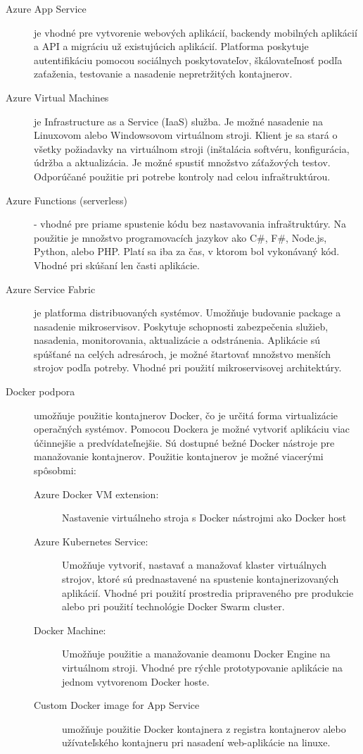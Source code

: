\begin{description}
    \item[Azure App Service] je vhodné pre vytvorenie webových aplikácií, backendy mobilných aplikácií a API a migráciu už existujúcich aplikácií.
    Platforma poskytuje autentifikáciu pomocou sociálnych poskytovateľov, škálovateľnosť podľa zaťaženia, testovanie a nasadenie nepretržitých kontajnerov.
    \item[Azure Virtual Machines] je Infrastructure as a Service (IaaS) služba. Je možné nasadenie na Linuxovom alebo Windowsovom  virtuálnom stroji. Klient je sa stará o všetky požiadavky na virtuálnom stroji (inštalácia softvéru, konfigurácia, údržba a aktualizácia. Je možné spustiť množstvo záťažových testov. Odporúčané použitie pri potrebe kontroly nad celou infraštruktúrou.
    \item[Azure Functions (serverless)]  - vhodné pre priame spustenie kódu bez nastavovania infraštruktúry. Na použitie je množstvo programovacích jazykov ako C\#, F\#, Node.js, Python, alebo PHP. Platí sa iba za čas, v ktorom bol vykonávaný kód. Vhodné pri skúšaní len časti aplikácie.
    \item[Azure Service Fabric] je platforma distribuovaných systémov. Umožňuje budovanie package a nasadenie mikroservisov. Poskytuje schopnosti zabezpečenia služieb, nasadenia, monitorovania, aktualizácie a odstránenia. Aplikácie sú spúšťané na celých adresároch, je možné štartovať množstvo menších strojov podľa potreby. Vhodné pri použití mikroservisovej architektúry.
    \item[Docker podpora] umožňuje použitie kontajnerov Docker, čo je určitá forma virtualizácie operačných systémov. Pomocou Dockera je možné vytvoriť aplikáciu viac účinnejšie a predvídateľnejšie. Sú dostupné bežné Docker nástroje pre manažovanie kontajnerov. Použitie kontajnerov je možné viacerými spôsobmi:
    \begin{description}
        \item[Azure Docker VM extension:]
            Nastavenie virtuálneho stroja s Docker nástrojmi ako Docker host
        \item[Azure Kubernetes Service:]
        Umožňuje vytvoriť, nastavať a manažovať klaster virtuálnych strojov, ktoré sú prednastavené na spustenie kontajnerizovaných aplikácií. Vhodné pri použití prostredia pripraveného pre produkcie alebo pri použití technológie Docker Swarm cluster.
        \item[Docker Machine:] Umožňuje použitie a manažovanie deamonu Docker Engine na virtuálnom stroji. Vhodné pre rýchle prototypovanie aplikácie na jednom vytvorenom Docker hoste.
        \item[Custom Docker image for App Service] umožňuje použitie Docker kontajnera z registra kontajnerov alebo užívateľského kontajneru pri nasadení web-aplikácie na linuxe.
    \end{description}
\end{description}

